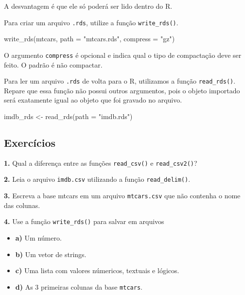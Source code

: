 \documentclass[
]{book}
\newenvironment{Shaded}{\begin{snugshade}}{\end{snugshade}}
\newcommand{\AttributeTok}[1]{\textcolor[rgb]{0.77,0.63,0.00}{#1}}
\newcommand{\FunctionTok}[1]{\textcolor[rgb]{0.00,0.00,0.00}{#1}}
\newcommand{\NormalTok}[1]{#1}
\newcommand{\OtherTok}[1]{\textcolor[rgb]{0.56,0.35,0.01}{#1}}
\newcommand{\StringTok}[1]{\textcolor[rgb]{0.31,0.60,0.02}{#1}}
\begin{document}
A desvantagem é que ele só poderá ser lido dentro do R.

Para criar um arquivo \texttt{.rds}, utilize a função \texttt{write\_rds()}.

\begin{Shaded}
\begin{Highlighting}[]
\FunctionTok{write\_rds}\NormalTok{(mtcars, }\AttributeTok{path =} \StringTok{"mtcars.rds"}\NormalTok{, }\AttributeTok{compress =} \StringTok{"gz"}\NormalTok{)}
\end{Highlighting}
\end{Shaded}

O argumento \texttt{compress} é opcional e indica qual o tipo de compactação deve ser feito. O padrão é não compactar.

Para ler um arquivo \texttt{.rds} de volta para o R, utilizamos a função \texttt{read\_rds()}. Repare que essa função não possui outros argumentos, pois o objeto importado será exatamente igual ao objeto que foi gravado no arquivo.

\begin{Shaded}
\begin{Highlighting}[]
\NormalTok{imdb\_rds }\OtherTok{\textless{}{-}} \FunctionTok{read\_rds}\NormalTok{(}\AttributeTok{path =} \StringTok{"imdb.rds"}\NormalTok{)}
\end{Highlighting}
\end{Shaded}

\hypertarget{exercuxedcios-9}{%
\subsection*{Exercícios}\label{exercuxedcios-9}}

\textbf{1.} Qual a diferença entre as funções \texttt{read\_csv()} e \texttt{read\_csv2()}?

\textbf{2.} Leia o arquivo \texttt{imdb.csv} utilizando a função \texttt{read\_delim()}.

\textbf{3.} Escreva a base mtcars em um arquivo \texttt{mtcars.csv} que não contenha o nome das colunas.

\textbf{4.} Use a função \texttt{write\_rds()} para salvar em arquivos

\begin{itemize}
\item
  \textbf{a)} Um número.
\item
  \textbf{b)} Um vetor de strings.
\item
  \textbf{c)} Uma lista com valores númericos, textuais e lógicos.
\item
  \textbf{d)} As 3 primeiras colunas da base \texttt{mtcars}.
\end{itemize}
\end{document}
